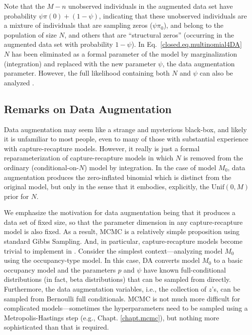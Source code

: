 Note that the $M-n$ unobserved individuals in the augmented data set
have probability $\psi \pi(0) + (1-\psi)$, indicating that these
unobserved individuals are a mixture of individuals that are sampling
zeros ($\psi \pi_0$), and belong to the population of size $N$, and
others that are ``structural zeros'' (occurring in the augmented data
set with probability $1 - \psi$). In Eq.~\ref{closed.eq.multinomial4DA} $N$
has been eliminated as a formal parameter of the model by
marginalization (integration) and replaced with the new parameter
$\psi$, the data augmentation parameter.
However, the full likelihood containing both $N$ and $\psi$ can also be
analyzed \citep[see][]{royle_etal:2007}.


\subsection{Remarks on Data Augmentation}


Data augmentation may seem like a strange and mysterious black-box,
and likely it is unfamiliar to most people, even to many of those with substantial
experience with capture-recapture models. However, it really is just a
formal reparameterization of capture-recapture models in which $N$ is
removed from the ordinary (conditional-on-$N$) model by integration.
In the case of model $M_0$, data augmentation produces the zero-inflated
binomial which is distinct from the original model, but
only in the sense that it embodies, explicitly, the $\mbox{Unif}(0,M)$
prior for $N$.

We emphasize the motivation for data augmentation being that it
produces a data set of fixed size, so that the parameter dimension in
any capture-recapture model is also fixed.  As a result, MCMC is a
relatively simple proposition using standard Gibbs Sampling.  And, in
particular, capture-recapture models become trivial to implement in
\bugs. Consider
the simplest context---analyzing model $M_0$ using the occupancy-type
model. In this case, DA converts model $M_0$ to a basic occupancy model
and the parameters $p$ and $\psi$ have known full-conditional
distributions (in fact, beta distributions) that can be sampled from
directly.  Furthermore, the data augmentation variables, i.e., the collection
of $z$'s, can be sampled from Bernoulli full
conditionals. MCMC is not much more difficult for complicated
models---sometimes the hyperparameters need to be sampled using a
Metropolis-Hastings step (e.g., Chapt. \ref{chapt.mcmc}), but nothing more sophisticated than that is
required.

